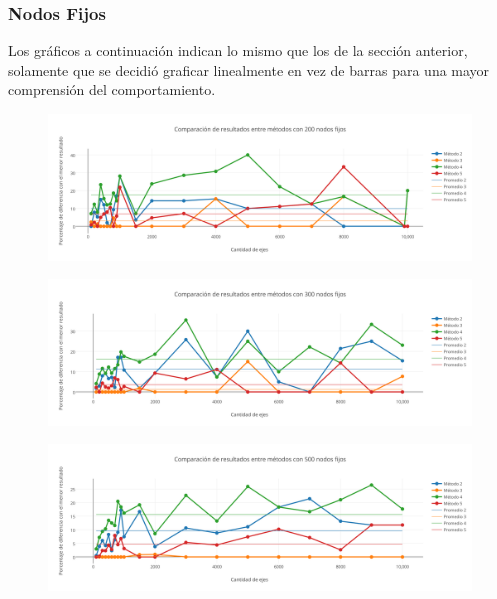   
\newpage  
  
\subsubsection*{Nodos Fijos}

Los gráficos a continuación indican lo mismo que los de la sección anterior, solamente que se decidió graficar linealmente en vez de barras para una mayor comprensión del comportamiento.

  \begin{figure}[h!]
   \begin{center}
 	\includegraphics[scale=0.55]{imagenes/local/resultados/200nodos.png}
   \end{center}
 \end{figure}
 
  \begin{figure}[h!]
   \begin{center}
 	\includegraphics[scale=0.55]{imagenes/local/resultados/300nodos.png}
   \end{center}
 \end{figure}
 

  \begin{figure}[h!]
   \begin{center}
 	\includegraphics[scale=0.55]{imagenes/local/resultados/500nodos.png}
   \end{center}
 \end{figure}
 

